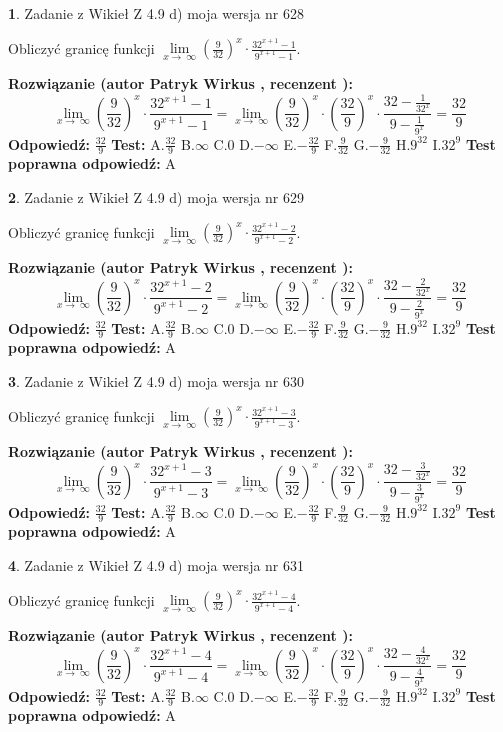 \documentclass[12pt, a4paper]{article}
\theoremstyle{definition} %
\newtheorem{zad}{}
\newcommand{\zadStart}[1]{\begin{zad}#1\newline}
\newcommand{\zadStop}{\end{zad}}
\newcommand{\rozwStart}[2]{\noindent \textbf{Rozwiązanie (autor #1 , recenzent #2): }\newline}
\newcommand{\rozwStop}{\newline}
\newcommand{\odpStart}{\noindent \textbf{Odpowiedź:}\newline}
\newcommand{\odpStop}{\newline}
\newcommand{\testStart}{\noindent \textbf{Test:}\newline}
\newcommand{\testStop}{\newline}
\newcommand{\kluczStart}{\noindent \textbf{Test poprawna odpowiedź:}\newline}
\newcommand{\kluczStop}{\newline}
\begin{document}
\zadStart{Zadanie z Wikieł Z 4.9 d) moja wersja nr 628}


Obliczyć granicę funkcji  $\lim\limits_{x\to\ \infty}(\frac{9}{32})^{x}\cdot\frac{32^{x+1}-1}{9^{x+1}-1}$.
\zadStop
\rozwStart{Patryk Wirkus}{}
$$\lim\limits_{x\to\ \infty}(\frac{9}{32})^{x}\cdot\frac{32^{x+1}-1}{9^{x+1}-1}=\lim\limits_{x\to\ \infty}(\frac{9}{32})^{x}\cdot(\frac{32}{9})^{x} \cdot \frac{32-\frac{1}{32^{x}}}{9-\frac{1}{9^{x}}} = \frac{32}{9}$$
\rozwStop
\odpStart
$\frac{32}{9}$
\odpStop
\testStart
A.$\frac{32}{9}$ B.$\infty$ C.$0$ D.$-\infty$ E.$-\frac{32}{9}$
F.$\frac{9}{32}$ G.$-\frac{9}{32}$
H.$9^{32}$
I.$32^{9}$
\testStop
\kluczStart
A
\kluczStop



\zadStart{Zadanie z Wikieł Z 4.9 d) moja wersja nr 629}


Obliczyć granicę funkcji  $\lim\limits_{x\to\ \infty}(\frac{9}{32})^{x}\cdot\frac{32^{x+1}-2}{9^{x+1}-2}$.
\zadStop
\rozwStart{Patryk Wirkus}{}
$$\lim\limits_{x\to\ \infty}(\frac{9}{32})^{x}\cdot\frac{32^{x+1}-2}{9^{x+1}-2}=\lim\limits_{x\to\ \infty}(\frac{9}{32})^{x}\cdot(\frac{32}{9})^{x} \cdot \frac{32-\frac{2}{32^{x}}}{9-\frac{2}{9^{x}}} = \frac{32}{9}$$
\rozwStop
\odpStart
$\frac{32}{9}$
\odpStop
\testStart
A.$\frac{32}{9}$ B.$\infty$ C.$0$ D.$-\infty$ E.$-\frac{32}{9}$
F.$\frac{9}{32}$ G.$-\frac{9}{32}$
H.$9^{32}$
I.$32^{9}$
\testStop
\kluczStart
A
\kluczStop



\zadStart{Zadanie z Wikieł Z 4.9 d) moja wersja nr 630}


Obliczyć granicę funkcji  $\lim\limits_{x\to\ \infty}(\frac{9}{32})^{x}\cdot\frac{32^{x+1}-3}{9^{x+1}-3}$.
\zadStop
\rozwStart{Patryk Wirkus}{}
$$\lim\limits_{x\to\ \infty}(\frac{9}{32})^{x}\cdot\frac{32^{x+1}-3}{9^{x+1}-3}=\lim\limits_{x\to\ \infty}(\frac{9}{32})^{x}\cdot(\frac{32}{9})^{x} \cdot \frac{32-\frac{3}{32^{x}}}{9-\frac{3}{9^{x}}} = \frac{32}{9}$$
\rozwStop
\odpStart
$\frac{32}{9}$
\odpStop
\testStart
A.$\frac{32}{9}$ B.$\infty$ C.$0$ D.$-\infty$ E.$-\frac{32}{9}$
F.$\frac{9}{32}$ G.$-\frac{9}{32}$
H.$9^{32}$
I.$32^{9}$
\testStop
\kluczStart
A
\kluczStop



\zadStart{Zadanie z Wikieł Z 4.9 d) moja wersja nr 631}


Obliczyć granicę funkcji  $\lim\limits_{x\to\ \infty}(\frac{9}{32})^{x}\cdot\frac{32^{x+1}-4}{9^{x+1}-4}$.
\zadStop
\rozwStart{Patryk Wirkus}{}
$$\lim\limits_{x\to\ \infty}(\frac{9}{32})^{x}\cdot\frac{32^{x+1}-4}{9^{x+1}-4}=\lim\limits_{x\to\ \infty}(\frac{9}{32})^{x}\cdot(\frac{32}{9})^{x} \cdot \frac{32-\frac{4}{32^{x}}}{9-\frac{4}{9^{x}}} = \frac{32}{9}$$
\rozwStop
\odpStart
$\frac{32}{9}$
\odpStop
\testStart
A.$\frac{32}{9}$ B.$\infty$ C.$0$ D.$-\infty$ E.$-\frac{32}{9}$
F.$\frac{9}{32}$ G.$-\frac{9}{32}$
H.$9^{32}$
I.$32^{9}$
\testStop
\kluczStart
A
\kluczStop
\end{document}
